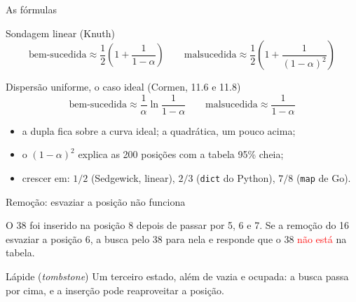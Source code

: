 \documentclass{beamer}
\newcommand{\tcr}[1]{\textcolor{red}{#1}}
\begin{document}
\begin{frame}{As fórmulas}
	\begin{block}{Sondagem linear (Knuth)}
		\[
			\text{bem-sucedida} \approx \frac{1}{2}\left(1 + \frac{1}{1-\alpha}\right)
			\qquad
			\text{malsucedida} \approx \frac{1}{2}\left(1 + \frac{1}{(1-\alpha)^2}\right)
		\]
	\end{block}

	\begin{block}{Dispersão uniforme, o caso ideal (Cormen, 11.6 e 11.8)}
		\[
			\text{bem-sucedida} \approx \frac{1}{\alpha} \ln \frac{1}{1-\alpha}
			\qquad
			\text{malsucedida} \approx \frac{1}{1-\alpha}
		\]
	\end{block}

	\vspace{0.2cm}
	\begin{itemize}
		\item a dupla fica sobre a curva ideal; a quadrática, um pouco acima;
		\item o $(1-\alpha)^2$ explica as 200 posições com a tabela 95\% cheia;
		\item crescer em: $1/2$ (Sedgewick, linear), $2/3$ (\texttt{dict} do
		      Python), $7/8$ (\texttt{map} de Go).
	\end{itemize}

\end{frame}

\begin{frame}{Remoção: esvaziar a posição não funciona}
	\begin{center}
	\end{center}

	\vspace{0.3cm}
	O 38 foi inserido na posição 8 depois de passar por 5, 6 e 7. Se a remoção do
	16 esvaziar a posição 6, a busca pelo 38 para nela e responde que o 38
	\tcr{não está} na tabela.

	\vspace{0.4cm}
	\begin{block}{Lápide (\emph{tombstone})}
		Um terceiro estado, além de vazia e ocupada: a busca passa por cima, e a
		inserção pode reaproveitar a posição.
	\end{block}
\end{frame}
\end{document}
